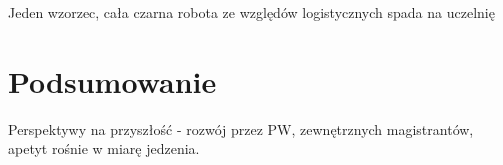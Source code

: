 \documentclass{pracamgr}
\begin{document}
Jeden wzorzec, cała czarna robota ze względów logistycznych spada na uczelnię

\chapter{Podsumowanie}

Perspektywy na przyszłość - rozwój przez PW, zewnętrznych magistrantów, apetyt rośnie w miarę jedzenia.

\appendix

\newpage
\listoffigures


\begin{thebibliography}{99}


\end{thebibliography}
\end{document}

